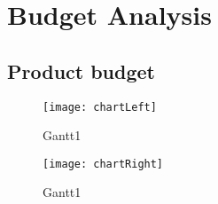 \chapter{Budget Analysis}
\label{ch:budget}
	
	\section{Product budget}

		\begin{figure}[h]
			\centering
		    	\texttt{[image: chartLeft]}
	  		\caption{Gantt1}
			\label{fig:x}
		\end{figure}
		\begin{figure}[h]
			\centering
		    	\texttt{[image: chartRight]}
	  		\caption{Gantt1}
			\label{fig:y}
		\end{figure}
